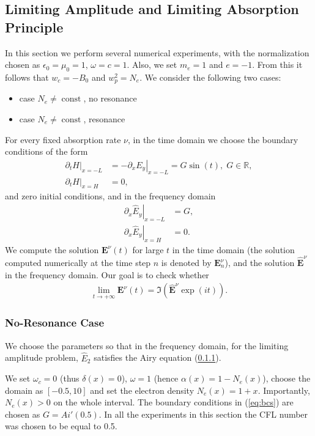 \documentclass[a4paper,10pt]{article}
\begin{document}
\subsection{Limiting Amplitude and Limiting Absorption Principle}
In this section we perform several numerical experiments,
with the normalization chosen as $\epsilon_0=\mu_0=1$, $\omega=c=1$. 
Also, we set $m_e=1$ and $e=-1$. From this it follows that $w_c=-B_0$ and $w_p^2=N_e$. 
We consider the following two cases:
\begin{itemize}
 \item case $N_e\neq \operatorname{const}$, no resonance
 \item case $N_e\neq \operatorname{const}$, resonance
\end{itemize}
For every fixed absorption rate $\nu$, in the time domain we choose the boundary conditions of the form
\begin{align}
\label{eq:bcs}
\left.\partial_t H\right|_{x=-L}&=-\left.\partial_x E_y\right|_{x=-L}=G\sin(t),\; G\in \mathbb{R}, \\
 \nonumber
 \left.\partial_t H\right|_{x=H}&=0,
\end{align}
and zero initial conditions, and in the frequency domain
\begin{align*}
 \left.\partial_x \hat{E}_y\right|_{x=-L}&=G,\\
 \left.\partial_x \hat{E}_y\right|_{x=H}&=0.
\end{align*}
We compute the solution $\mathbf{E}^{\nu}(t)$ for large $t$ in the time domain (the solution computed numerically at the time step $n$ is denoted by $\mathbf{E}^{\nu}_{n}$), and the solution $\hat{\mathbf{E}}^{\nu}$ in the frequency domain. 
Our goal is to check whether
\begin{align*}
\lim_{t\rightarrow+\infty}\mathbf{E}^{\nu}(t)=\Im\left(\hat{\mathbf{E}}^{\nu}\exp(it)\right).
\end{align*}

\subsubsection{No-Resonance Case}
We choose the parameters so that in the frequency domain, for the limiting amplitude problem, $\hat{E}_{2}$ satisfies 
the Airy equation (\ref{}). 

We set $\omega_c=0$ (thus $\delta(x)=0$), $\omega=1$ (hence $\alpha(x)=1-N_e(x)$), 
choose the domain as $[-0.5, 10]$ and set the electron density $N_e(x)=1+x$. Importantly, $N_e(x)>0$ on the whole interval.
The boundary conditions in (\ref{eq:bcs}) are chosen as $G=Ai'(0.5)$. 
In all the experiments in this section the CFL number was chosen to be equal to 0.5.
\end{document}
